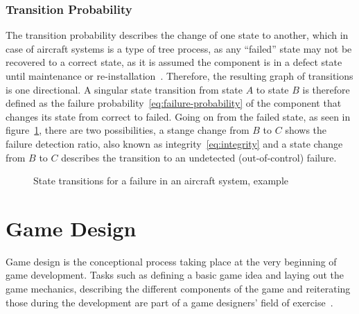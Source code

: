 \subsubsection{Transition Probability}\label{subsubsec:transition-probability}
The transition probability describes the change of one state to another, which in case of aircraft systems is a type of tree
process, as any ``failed'' state may not be recovered to a correct state, as it is assumed the component is in a defect state until
maintenance or re-installation~\cite{markov-processes}.
Therefore, the resulting graph of transitions is one directional.
A singular state transition from state $A$ to state $B$ is therefore defined as the failure probability~\ref{eq:failure-probability}
of the component that changes its state from correct to failed.
Going on from the failed state, as seen in figure~\ref{fig:state-change}, there are two possibilities,
a stange change from $B$ to $C$ shows the failure detection ratio, also known as integrity~\ref{eq:integrity}
and a state change from $B$ to $C$ describes the transition to an undetected (out-of-control) failure.
\begin{figure}
    \begin{center}
    \end{center}
    \caption{State transitions for a failure in an aircraft system, example}
    \label{fig:state-change}
\end{figure}
\section{Game Design}\label{sec:game-design}
Game design is the conceptional process taking place at the very beginning of game development.
Tasks such as defining a basic game idea and laying out the game mechanics, describing the different components of the game and
reiterating those during the development are part of a game designers' field of exercise~\cite{10.5555/2544002}.

